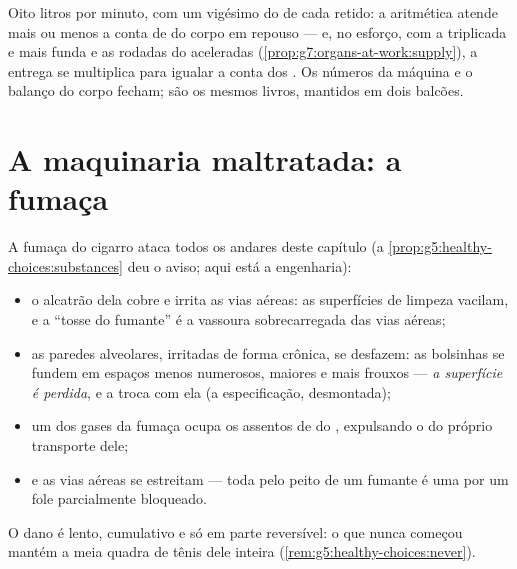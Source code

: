 \begin{example}\label{ex:g7:lungs-and-gas-exchange:accounting}
Oito litros por minuto, com um vigésimo do  de cada 
retido: a aritmética atende mais ou menos a conta de  do corpo
em repouso --- e, no esforço, com a  triplicada e mais funda
e as rodadas do  aceleradas
(\cref{prop:g7:organs-at-work:supply}), a entrega se multiplica para
igualar a conta dos . Os números da máquina e o balanço do
corpo fecham; são os mesmos livros, mantidos em dois balcões.
\end{example}

\section{A maquinaria maltratada: a fumaça}

\begin{proposition}\label{prop:g7:lungs-and-gas-exchange:smoke}
A fumaça do cigarro ataca todos os andares deste capítulo (a
\cref{prop:g5:healthy-choices:substances} deu o aviso; aqui está a
engenharia):
\begin{itemize}
  \item o alcatrão dela cobre e irrita as vias aéreas: as superfícies
        de limpeza vacilam, e a ``tosse do fumante'' é a vassoura
        sobrecarregada das vias aéreas;
  \item as paredes alveolares, irritadas de forma crônica, se
        desfazem: as bolsinhas se fundem em espaços menos numerosos,
        maiores e mais frouxos --- \emph{a superfície é perdida}, e a
        troca com ela (a especificação, desmontada);
  \item um dos gases da fumaça ocupa os assentos de  do
        , expulsando o  do próprio transporte dele;
  \item e as vias aéreas se estreitam --- toda  pelo peito
        de um fumante é uma  por um fole parcialmente
        bloqueado.
\end{itemize}
O dano é lento, cumulativo e só em parte reversível: o  que
nunca começou mantém a meia quadra de tênis dele inteira
(\cref{rem:g5:healthy-choices:never}).
\end{proposition}
\admitted

